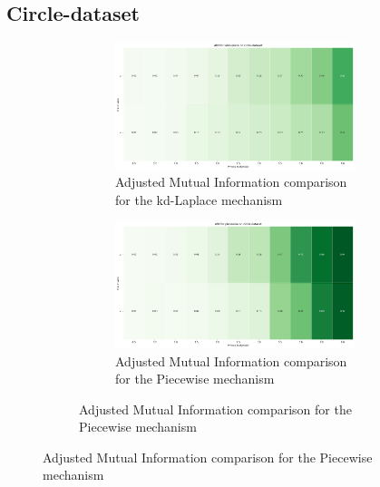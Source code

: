 \subsection{Circle-dataset}
\begin{figure}[H]
    \centering
    \begin{subfigure}[b]{0.85\textwidth}
        \begin{subfigure}[c]{1\textwidth}
            \includegraphics[width=1\textwidth]{Results/kd-laplace/kd-Laplace/circle-dataset/ami.png}
            \caption{Adjusted Mutual Information comparison for the kd-Laplace mechanism}
            \label{fig:ami_circle-dataset_comparison_kdlaplace_2d}
        \end{subfigure}
        \vfill %
        \begin{subfigure}[c]{1\textwidth}
            \includegraphics[width=1\textwidth]{Results/kd-laplace/piecewise/circle-dataset/ami.png}
            \caption{Adjusted Mutual Information comparison for the Piecewise mechanism}
            \label{fig:ami_circle-dataset_comparison_piecewise_2d}
        \end{subfigure}
    \end{subfigure}

\end{figure}
